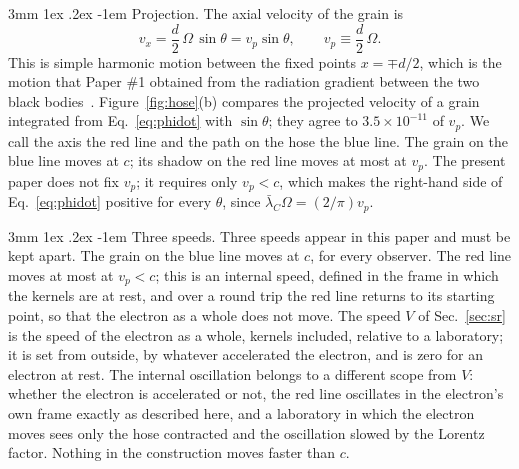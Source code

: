 \documentclass[%
 reprint, amsmath,amssymb, aps, prb, ]{revtex4-2}
\makeatletter
\numberwithin{equation}{section}
\renewcommand\paragraph{%
  \@startsection{paragraph}{4}{\z@}%
    {3mm \@plus 1ex \@minus .2ex}%
    {-1em}%
    {\normalfont\normalsize\itshape}}
\newcommand{\lbar}{\bar{\lambda}_C}
\makeatother
\begin{document}
\paragraph{Projection.} The axial velocity of the grain is
\begin{equation}
v_x = \frac{d}{2}\,\Omega\,\sin\theta = v_p \sin\theta, \qquad v_p \equiv \frac{d}{2}\,\Omega .
\label{eq:vx}
\end{equation}
This is simple harmonic motion between the fixed points $x = \mp d/2$, which is the motion that Paper \#1 obtained from the radiation gradient between the two black bodies~\cite{H01}. Figure~\ref{fig:hose}(b) compares the projected velocity of a grain integrated from Eq.~\eqref{eq:phidot} with $\sin\theta$; they agree to $3.5\times10^{-11}$ of $v_p$. We call the axis the red line and the path on the hose the blue line. The grain on the blue line moves at $c$; its shadow on the red line moves at most at $v_p$. The present paper does not fix $v_p$; it requires only $v_p < c$, which makes the right-hand side of Eq.~\eqref{eq:phidot} positive for every $\theta$, since $\lbar\Omega = (2/\pi)v_p$.

\paragraph{Three speeds.} Three speeds appear in this paper and must be kept apart. The grain on the blue line moves at $c$, for every observer. The red line moves at most at $v_p < c$; this is an internal speed, defined in the frame in which the kernels are at rest, and over a round trip the red line returns to its starting point, so that the electron as a whole does not move. The speed $V$ of Sec.~\ref{sec:sr} is the speed of the electron as a whole, kernels included, relative to a laboratory; it is set from outside, by whatever accelerated the electron, and is zero for an electron at rest. The internal oscillation belongs to a different scope from $V$: whether the electron is accelerated or not, the red line oscillates in the electron's own frame exactly as described here, and a laboratory in which the electron moves sees only the hose contracted and the oscillation slowed by the Lorentz factor. Nothing in the construction moves faster than $c$.
\end{document}
